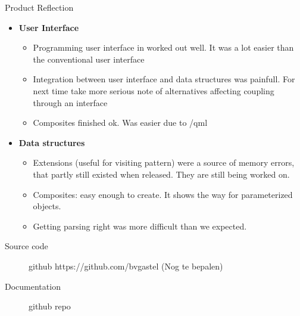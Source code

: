 \documentclass[11pt]{beamer}
\begin{document}
\begin{frame}{Product Reflection}
	\begin{itemize}
		\item {\bf User Interface} 
				\begin{itemize}
					\item Programming user interface in \qml worked out well.
							It was a lot easier than the conventional user interface
					\item Integration between user interface and data structures
							was painfull. For next time take more serious note
							of alternatives affecting coupling through an interface
					\item Composites finished ok. Was easier due to /qml
				\end{itemize}
		\item {\bf Data structures}
				\begin{itemize}
					\item Extensions (useful for visiting pattern) were a source
							of memory errors, that partly still existed when
							released. They are still being worked on.
					\item Composites: easy enough to create. It shows the way
							for parameterized objects.
					\item Getting parsing right was more difficult than we expected.
				\end{itemize}
	\end{itemize}
\end{frame}

\begin{frame}
	\begin{description}
		\item[Source code] github https://github.com/bvgastel (Nog te bepalen)
		\item[Documentation] github repo
	\end{description}
\end{frame}
\end{document}
